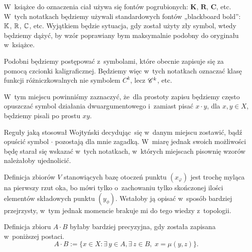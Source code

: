 \documentclass[a4paper,11pt]{article}
\begin{document}
\newpage





\start W~książce do oznaczenia ciał używa się fontów pogrubionych:
$\mathbf{K}$, $\mathbf{R}$, $\mathbf{C}$, etc. W~tych notatkach będziemy
używali standardowych fontów „blackboard bold”: $\mathbb{K}$, $\mathbb{R}$, $\mathbb{C}$, etc.
Wyjątkiem będzie sytuacja, gdy został użyty zły symbol, wtedy będziemy
dążyć, by wzór poprawiany bym maksymalnie podobny do oryginału w~książce.

Podobni będziemy postępować z~symbolami, które obecnie zapisuje się za
pomocą czcionki kaligraficznej. Będziemy więc w~tych notatkach oznaczać
klasę funkcji różniczkowalnych nie symbolem $C^{ k }$, lecz $\mathcal{C}^{ k }$, etc.







\start {} W~tym miejscu powinniśmy zaznaczyć, że~dla prostoty zapisu
będziemy często opuszczać symbol działania dwuargumentowego i~zamiast pisać
$x \cdot y$, dla $x, y \in X$, będziemy pisali po prostu $x y$.

Reguły jaką stosował Wojtyński decydując~się w~danym miejscu zostawić, bądź
opuścić symbol $\cdot$ pozostają dla mnie zagadką. W~miarę jednak swoich
możliwości będę starał się wskazać w~tych notatkach, w~których miejscach
pisownię wzorów należałoby ujednolicić.

\vspace{\spaceFour}





\start {} Definicja zbiorów $V$ stanowiących bazę otoczeń punktu
$( x_{ \varphi } )$ jest trochę myląca na pierwszy rzut oka, bo mówi tylko
o~zachowaniu tylko skończonej ilości elementów składowych punktu
$( y_{ \phi } )$. Wstałoby ją opisać w~sposób bardziej przejrzysty, w~tym
jednak momencie brakuje mi do tego wiedzy z~topologii.

\vspace{\spaceFour}





\start {} Definicja zbioru $A \cdot B$ byłaby bardziej precyzyjna, gdy
została zapisana w~poniższej postaci.
\begin{equation}
  \label{eq:Wojtynski-01}
  A \cdot B := \{ x \in X : \exists\, y \in A, \exists\, z \in B,\; x = \mu( y, z ) \}.
\end{equation}
\end{document}
